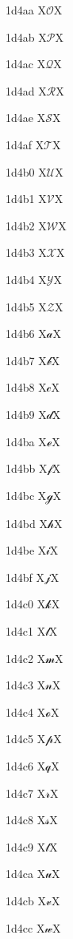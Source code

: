 \documentclass[11pt]{article}
\begin{document}
1d4aa X{\ensuremath{\mathscr{O}}}X

1d4ab X{\ensuremath{\mathscr{P}}}X

1d4ac X{\ensuremath{\mathscr{Q}}}X

1d4ad X{\ensuremath{\mathscr{R}}}X

1d4ae X{\ensuremath{\mathscr{S}}}X

1d4af X{\ensuremath{\mathscr{T}}}X

1d4b0 X{\ensuremath{\mathscr{U}}}X

1d4b1 X{\ensuremath{\mathscr{V}}}X

1d4b2 X{\ensuremath{\mathscr{W}}}X

1d4b3 X{\ensuremath{\mathscr{X}}}X

1d4b4 X{\ensuremath{\mathscr{Y}}}X

1d4b5 X{\ensuremath{\mathscr{Z}}}X

1d4b6 X{\ensuremath{\mathscr{a}}}X

1d4b7 X{\ensuremath{\mathscr{b}}}X

1d4b8 X{\ensuremath{\mathscr{c}}}X

1d4b9 X{\ensuremath{\mathscr{d}}}X

1d4ba X{\ensuremath{\mathscr{e}}}X

1d4bb X{\ensuremath{\mathscr{f}}}X

1d4bc X{\ensuremath{\mathscr{g}}}X

1d4bd X{\ensuremath{\mathscr{h}}}X

1d4be X{\ensuremath{\mathscr{i}}}X

1d4bf X{\ensuremath{\mathscr{j}}}X

1d4c0 X{\ensuremath{\mathscr{k}}}X

1d4c1 X{\ensuremath{\mathscr{l}}}X

1d4c2 X{\ensuremath{\mathscr{m}}}X

1d4c3 X{\ensuremath{\mathscr{n}}}X

1d4c4 X{\ensuremath{\mathscr{o}}}X

1d4c5 X{\ensuremath{\mathscr{p}}}X

1d4c6 X{\ensuremath{\mathscr{q}}}X

1d4c7 X{\ensuremath{\mathscr{r}}}X

1d4c8 X{\ensuremath{\mathscr{s}}}X

1d4c9 X{\ensuremath{\mathscr{t}}}X

1d4ca X{\ensuremath{\mathscr{u}}}X

1d4cb X{\ensuremath{\mathscr{v}}}X

1d4cc X{\ensuremath{\mathscr{w}}}X
\end{document}
